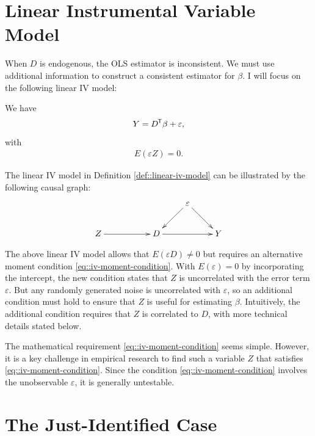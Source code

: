 \section{Linear Instrumental Variable Model}
\label{sec::linear-iv-model}



When $D$ is endogenous, the OLS estimator is inconsistent. We must use additional information to construct a consistent estimator for $\beta$. 
I will focus on the following linear IV model:


\begin{definition}
\label{def::linear-iv-model}
We have 
$$
Y = D  ^{\mkern-1.5mu\mathsf{T}} \beta  + \varepsilon ,
$$
with
\begin{eqnarray}\label{eq::iv-moment-condition}
E(\varepsilon Z) = 0 . 
\end{eqnarray}
\end{definition}


The linear IV model in Definition \ref{def::linear-iv-model} can be illustrated by the following causal graph: 
$$
\xymatrix{
&&&\varepsilon  \ar[dl] \ar[dr] &\\
Z\ar[rr]&&D \ar[rr]&&Y
}
$$

The above linear IV model allows that $E(\varepsilon D) \neq 0$ but requires an alternative moment condition \eqref{eq::iv-moment-condition}. With $E(\varepsilon) = 0$ by incorporating the intercept, the new condition states that $Z$ is uncorrelated with the error term $\varepsilon$. But any randomly generated noise is uncorrelated with $\varepsilon$, so an additional condition must hold to ensure that $Z$ is useful for estimating $\beta$. Intuitively, the additional condition requires that $Z$ is correlated to $D$, with more technical details stated below.  
 

The mathematical requirement \eqref{eq::iv-moment-condition} seems simple. However, it is a key challenge in empirical research to find such a variable $Z$ that satisfies \eqref{eq::iv-moment-condition}. Since the condition \eqref{eq::iv-moment-condition} involves the unobservable $\varepsilon$, it is generally untestable. 
 


\section{The Just-Identified Case}
\label{sec::iv-just-identify}


